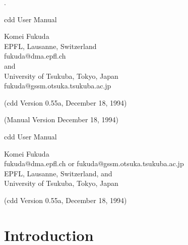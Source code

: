 %
\renewcommand{\baselinestretch}{1.0}
\setlength{\oddsidemargin}{8mm}
\setlength{\textwidth}{16cm}
\setlength{\topmargin}{0mm}
\setlength{\textheight}{23cm}
\setlength{\headsep}{0in}
\setlength{\headheight}{0pt}

\pagestyle{empty}



.\vspace{20mm}

\begin{center}

\vspace{20mm}

{\LARGE cdd User Manual}

\vspace{20mm}

{\Large Komei Fukuda\\
   EPFL, Lausanne, Switzerland\\
   fukuda@dma.epfl.ch\\
   and\\
   University of Tsukuba, Tokyo, Japan\\
  fukuda@gssm.otsuka.tsukuba.ac.jp
}

\vspace{20mm}
{\Large (cdd Version 0.55a,  December 18, 1994)}

{\Large (Manual  Version  December 18, 1994)}

\end{center}

\newpage
\pagestyle{plain}
\setcounter{page}{1} 

\begin{center}

{\Large cdd User Manual}

\bigskip
{\large Komei Fukuda\\
   fukuda@dma.epfl.ch  or  fukuda@gssm.otsuka.tsukuba.ac.jp\\
   EPFL, Lausanne, Switzerland, and\\
   University of Tsukuba, Tokyo, Japan}

\bigskip
{\large (cdd Version 0.55a,  December 18, 1994)}

\end{center}

\section{Introduction} \label{INTRODUCTION}

